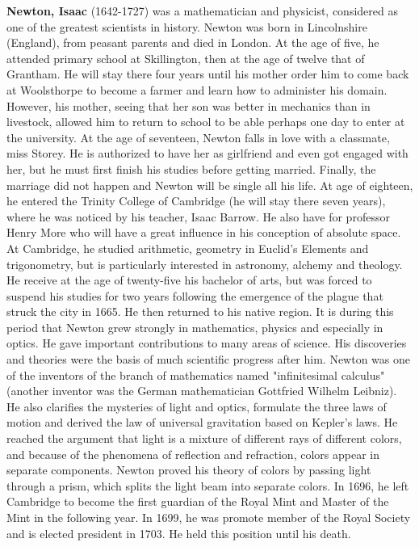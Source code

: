 \textbf{Newton, Isaac }(1642-1727) was a mathematician and physicist, considered as one of the greatest scientists in history. Newton was born in Lincolnshire (England), from peasant parents and died in London. At the age of five, he attended primary school at Skillington, then at the age of twelve that of Grantham. He will stay there four years until his mother order him to come back at Woolsthorpe to become a farmer and learn how to administer his domain. However, his mother, seeing that her son was better in mechanics than in livestock, allowed him to return to school to be able perhaps one day to enter at the university. At the age of seventeen, Newton falls in love with a classmate, miss Storey. He is authorized to have her as girlfriend and even got engaged with her, but he must first finish his studies before getting married. Finally, the marriage did not happen and Newton will be single all his life. At age of eighteen, he entered the Trinity College of Cambridge (he will stay there seven years), where he was noticed by his teacher, Isaac Barrow. He also have for professor Henry More who will have a great influence in his conception of absolute space. At Cambridge, he studied arithmetic, geometry in Euclid's Elements and trigonometry, but is particularly interested in astronomy, alchemy and theology. He receive at the age of twenty-five his bachelor of arts, but was forced to suspend his studies for two years following the emergence of the plague that struck the city in 1665. He then returned to his native region. It is during this period that Newton grew strongly in mathematics, physics and especially in optics. He gave important contributions to many areas of science. His discoveries and theories were the basis of much scientific progress after him. Newton was one of the inventors of the branch of mathematics named "infinitesimal calculus" (another inventor was the German mathematician Gottfried Wilhelm Leibniz). He also clarifies the mysteries of light and optics, formulate the three laws of motion and derived the law of universal gravitation based on Kepler's laws. He reached the argument that light is a mixture of different rays of different colors, and because of the phenomena of reflection and refraction, colors appear in separate components. Newton proved his theory of colors by passing light through a prism, which splits the light beam into separate colors. In 1696, he left Cambridge to become the first guardian of the Royal Mint and Master of the Mint in the following year. In 1699, he was promote member of the Royal Society and is elected president in 1703. He held this position until his death.


